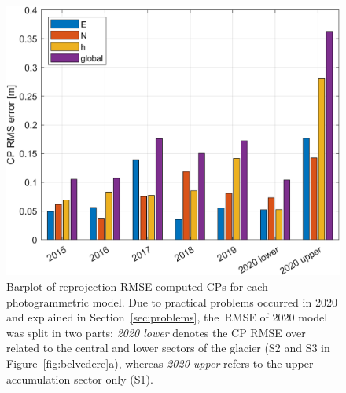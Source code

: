 \begin{figure}
    \centering
    \includegraphics[width=0.7\columnwidth]{CPrmse.png}
    \caption{Barplot of reprojection RMSE computed CPs for each photogrammetric
        model. Due to practical problems occurred in 2020 and explained in
        Section~\ref{sec:problems}, the~RMSE of 2020 model was split in two parts:
        \textit{2020
            lower} denotes the CP RMSE over related to the central and lower sectors of
        the glacier
        (S2 and S3 in Figure~\ref{fig:belvedere}a), whereas \textit{2020 upper} refers to
        the
        upper accumulation sector only (S1).}
    \label{fig:CP_errors}
\end{figure}

